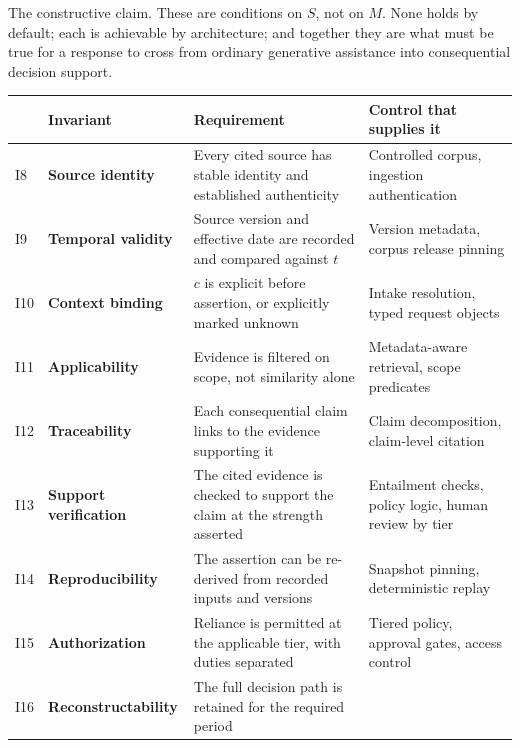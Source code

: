 The constructive claim. These are conditions on $S$, not on $M$. None holds by
default; each is achievable by architecture; and together they are what must be
true for a response to cross from ordinary generative assistance into consequential
decision support.

\begin{table}[ht]
  \centering
  \small
  \begin{tabular}{@{}>{\raggedright\arraybackslash}p{0.7cm}>{\raggedright\arraybackslash}p{3.3cm}>{\raggedright\arraybackslash}p{4.6cm}>{\raggedright\arraybackslash}p{4.4cm}@{}}
    \toprule
    & Invariant & Requirement & Control that supplies it \\
    \midrule
    I8 & \textbf{Source identity}
       & Every cited source has stable identity and established authenticity
       & Controlled corpus, ingestion authentication \\
    \addlinespace
    I9 & \textbf{Temporal validity}
       & Source version and effective date are recorded and compared against $t$
       & Version metadata, corpus release pinning \\
    \addlinespace
    I10 & \textbf{Context binding}
       & $c$ is explicit before assertion, or explicitly marked unknown
       & Intake resolution, typed request objects \\
    \addlinespace
    I11 & \textbf{Applicability}
       & Evidence is filtered on scope, not similarity alone
       & Metadata-aware retrieval, scope predicates \\
    \addlinespace
    I12 & \textbf{Traceability}
       & Each consequential claim links to the evidence supporting it
       & Claim decomposition, claim-level citation \\
    \addlinespace
    I13 & \textbf{Support verification}
       & The cited evidence is checked to support the claim at the strength asserted
       & Entailment checks, policy logic, human review by tier \\
    \addlinespace
    I14 & \textbf{Reproducibility}
       & The assertion can be re-derived from recorded inputs and versions
       & Snapshot pinning, deterministic replay \\
    \addlinespace
    I15 & \textbf{Authorization}
       & Reliance is permitted at the applicable tier, with duties separated
       & Tiered policy, approval gates, access control \\
    \addlinespace
    I16 & \textbf{Reconstructability}
       & The full decision path is retained for the required period

\end{tabular}
\end{table}
